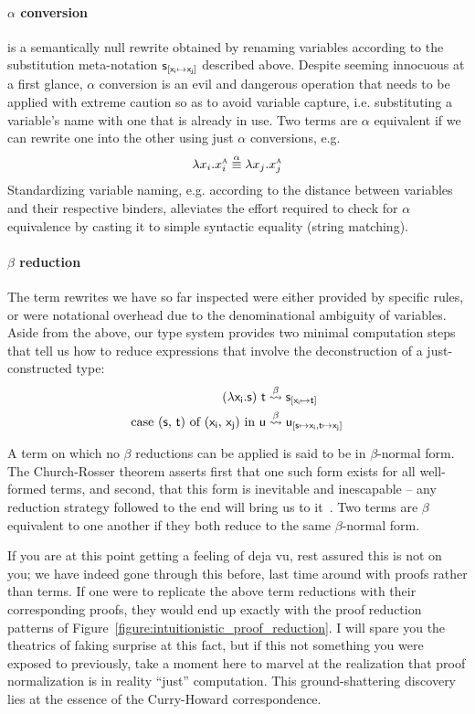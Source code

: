 \paragraph{$\alpha$ conversion} is a semantically null rewrite obtained by renaming variables according to the substitution meta-notation $\mathsf{s}_{[\mathsf{x_i } \mapsto \mathsf{x_j}]}$ described above. 
Despite seeming innocuous at a first glance, $\alpha$ conversion is an evil and dangerous operation that needs to be applied with extreme caution so as to avoid variable capture, i.e. substituting a variable's name with one that is already in use.  
Two terms are $\alpha$ equivalent if we can rewrite one into the other using just $\alpha$ conversions, e.g.
\[
	\lambda x_i .x_i ^{\smallprop{A}} \overset{\alpha}{\equiv} \lambda x_j.x_j^{\smallprop{A}}
\]
Standardizing variable naming, e.g. according to the distance between variables and their respective binders, alleviates the effort required to check for $\alpha$ equivalence by casting it to simple syntactic equality (string matching).

\paragraph{$\beta$ reduction}
The term rewrites we have so far inspected were either provided by specific rules, or were notational overhead due to the denominational ambiguity of variables.
Aside from the above, our type system provides two minimal computation steps that tell us how to reduce expressions that involve the deconstruction of a just-constructed type:
\begin{align*}
(\mathsf{\lambda x_i .s})~\mathsf{t} & \overset{\beta}{\leadsto} \mathsf{s}_{[\mathsf{x_i } \mapsto \mathsf{t}]}\\
\textrm{case (\ensuremath{\mathsf{s}}, \ensuremath{\mathsf{t}}) of (\ensuremath{\mathsf{x_i }}, \ensuremath{\mathsf{x_j}}) in \ensuremath{\mathsf{u}}} & \overset{\beta}{\leadsto} \mathsf{u_{[\mathsf{s} \mapsto \mathsf{x_i }, \mathsf{t} \mapsto \mathsf{x_j}]}}
\end{align*}

A term on which no $\beta$ reductions can be applied is said to be in $\beta$-normal form.
The Church-Rosser theorem asserts first that one such form exists for all well-formed terms, and second, that this form is inevitable and inescapable -- any reduction strategy followed to the end will bring us to it~\cite{barendregt1984lambda}.
Two terms are $\beta$ equivalent to one another if they both reduce to the same $\beta$-normal form.

If you are at this point getting a feeling of deja vu, rest assured this is not on you; we have indeed gone through this before, last time around with proofs rather than terms.
If one were to replicate the above term reductions with their corresponding proofs, they would end up exactly with the proof reduction patterns of Figure~\ref{figure:intuitionistic_proof_reduction}.
I will spare you the theatrics of faking surprise at this fact, but if this not something you were exposed to previously, take a moment here to marvel at the realization that proof normalization is in reality ``just'' computation.
This ground-shattering discovery lies at the essence of the Curry-Howard correspondence.

